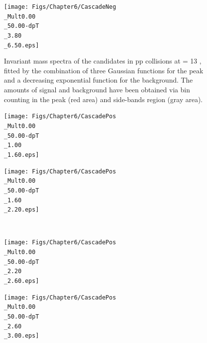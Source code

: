 \begin{figure}[!p]
\begin{minipage}[t]{.5\textwidth}
        \texttt{[image: Figs/Chapter6/CascadeNeg\\\_Mult0.00\\\_50.00-dpT\\\_3.80\\\_6.50.eps]}
    \end{minipage}
    \hfill
\caption{Invariant mass spectra of the \rmOmegaM candidates in pp collisions at \sqrtS = 13 \tev, fitted by the combination of three Gaussian functions for the peak and a decreasing exponential function for the background. The amounts of signal and background have been obtained via bin counting in the peak (red area) and side-bands region (gray area).}
	\label{fig:InvMassOmegaMinusVsPt}
\end{figure}

\begin{figure}[!p]
	\begin{minipage}[t]{.5\textwidth}
        \hspace*{-1.5cm}
        \texttt{[image: Figs/Chapter6/CascadePos\\\_Mult0.00\\\_50.00-dpT\\\_1.00\\\_1.60.eps]}
    \end{minipage}
    \hfill
    \begin{minipage}[t]{.5\textwidth}
        \hspace*{.5cm}
        \texttt{[image: Figs/Chapter6/CascadePos\\\_Mult0.00\\\_50.00-dpT\\\_1.60\\\_2.20.eps]}
    \end{minipage}\\
    \begin{minipage}[t]{.5\textwidth}
        \hspace*{-1.5cm}
        \texttt{[image: Figs/Chapter6/CascadePos\\\_Mult0.00\\\_50.00-dpT\\\_2.20\\\_2.60.eps]}
    \end{minipage}
    \hfill
    \begin{minipage}[t]{.5\textwidth}
        \hspace*{.5cm}
        \texttt{[image: Figs/Chapter6/CascadePos\\\_Mult0.00\\\_50.00-dpT\\\_2.60\\\_3.00.eps]}

\end{minipage}
\end{figure}
